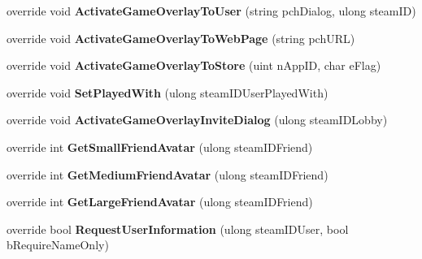 \begin{DoxyCompactItemize}
override void {\bfseries Activate\+Game\+Overlay\+To\+User} (string pch\+Dialog, ulong steam\+ID)
\item 
\mbox{\label{class_valve_1_1_steamworks_1_1_c_steam_friends_a621812f8fda81004f716f43966fab03d}} 
override void {\bfseries Activate\+Game\+Overlay\+To\+Web\+Page} (string pch\+U\+RL)
\item 
\mbox{\label{class_valve_1_1_steamworks_1_1_c_steam_friends_a0ee35257645127a256ed0c824af13802}} 
override void {\bfseries Activate\+Game\+Overlay\+To\+Store} (uint n\+App\+ID, char e\+Flag)
\item 
\mbox{\label{class_valve_1_1_steamworks_1_1_c_steam_friends_af375a7fe1344a3d8146c78cedc45e6f2}} 
override void {\bfseries Set\+Played\+With} (ulong steam\+I\+D\+User\+Played\+With)
\item 
\mbox{\label{class_valve_1_1_steamworks_1_1_c_steam_friends_aa398f556f853c5245974a5f3e788a5d5}} 
override void {\bfseries Activate\+Game\+Overlay\+Invite\+Dialog} (ulong steam\+I\+D\+Lobby)
\item 
\mbox{\label{class_valve_1_1_steamworks_1_1_c_steam_friends_a27d112bae7e75881f10beff57da857f6}} 
override int {\bfseries Get\+Small\+Friend\+Avatar} (ulong steam\+I\+D\+Friend)
\item 
\mbox{\label{class_valve_1_1_steamworks_1_1_c_steam_friends_af7ae4bfa2d8d9f6b6ce8ee62cbdb734f}} 
override int {\bfseries Get\+Medium\+Friend\+Avatar} (ulong steam\+I\+D\+Friend)
\item 
\mbox{\label{class_valve_1_1_steamworks_1_1_c_steam_friends_a360d079cb107e57b445509f2c694fac2}} 
override int {\bfseries Get\+Large\+Friend\+Avatar} (ulong steam\+I\+D\+Friend)
\item 
\mbox{\label{class_valve_1_1_steamworks_1_1_c_steam_friends_a08ec6ab8175bde64f87a267ba51c8deb}} 
override bool {\bfseries Request\+User\+Information} (ulong steam\+I\+D\+User, bool b\+Require\+Name\+Only)

\end{DoxyCompactItemize}

